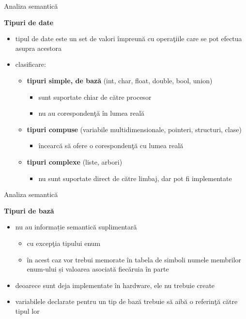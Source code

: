 \documentclass[pdf]{beamer}
\begin{document}
\begin{frame}{Analiza semantică}

\textbf{Tipuri de date}

\begin{itemize}
\item
tipul de date este un set de valori împreună cu operaţiile care se pot efectua asupra acestora

\item
clasificare:
\begin{itemize}
\item
\textbf{tipuri simple, de bază} (int, char, float, double, bool, union)
\begin{itemize}
\item
sunt suportate chiar de către procesor
\item
nu au corespondenţă în lumea reală
\end{itemize}

\item
\textbf{tipuri compuse} (variabile multidimensionale, pointeri, structuri, clase)
\begin{itemize}
\item
încearcă să ofere o corespondenţă cu lumea reală
\end{itemize}

\item
\textbf{tipuri complexe} (liste, arbori)
\begin{itemize}
\item
nu sunt suportate direct de către limbaj, dar pot fi implementate
\end{itemize}
\end{itemize}
\end{itemize}
\end{frame}



\begin{frame}{Analiza semantică}

\textbf{Tipuri de bază}

\begin{itemize}
\item
nu au informație semantică suplimentară
\begin{itemize}
\item
cu excepţia tipului enum
\item
în acest caz vor trebui memorate în tabela de simboli numele membrilor enum-ului și valoarea asociată fiecăruia în parte
\end{itemize}

\item
deoarece sunt deja implementate în hardware, ele nu trebuie create

\item
variabilele declarate pentru un tip de bază trebuie să aibă o referinţă către tipul lor
\end{itemize}
\end{frame}
\end{document}
